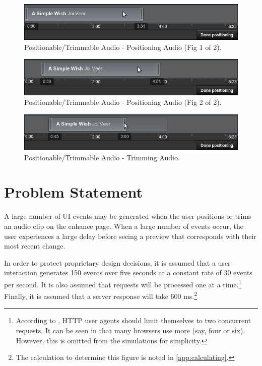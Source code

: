 \documentclass[se,resubmit]{uw-wkrpt}
\begin{document}
\begin{figure}
  \centering
  \includegraphics[width=6.25in]{position-drag-start}
  \caption{Positionable/Trimmable Audio - Positioning Audio (Fig 1 of 2).}
  \label{fig:position-drag-start}
\end{figure}

\begin{figure}
  \centering
  \includegraphics[width=6.25in]{position-drag-end}
  \caption{Positionable/Trimmable Audio - Positioning Audio (Fig 2 of 2).}
  \label{fig:position-drag-end}
\end{figure}

\begin{figure}
  \centering
  \includegraphics[width=6.25in]{trim}
  \caption{Positionable/Trimmable Audio - Trimming Audio.}
  \label{fig:trim}
\end{figure}

\section{Problem Statement}\label{sec:problem}
A large number of UI events may be generated when the user positions or
trims an audio clip on the enhance page. When a large number of events
occur, the user experiences a large delay before seeing a preview that
corresponds with their most recent change.

In order to protect proprietary design decisions, it is assumed that a
user interaction generates 150 events over five seconds at a constant rate
of 30 events per second. It is also assumed that requests will be
processed one at a time.\footnote{According to \cite{ref:http}, HTTP user
agents should limit themselves to two concurrent requests. It can be seen
in \cite{ref:b423377} that many browsers use more (say, four or six).
However, this is omitted from the simulations for simplicity.} Finally, it
is assumed that a server response will take 600 ms.\footnote{The
calculation to determine this figure is noted in \ref{app:calculating}.}
\end{document}
